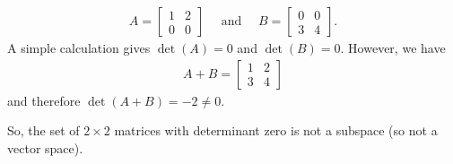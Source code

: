\documentclass[12pt]{article}
\begin{document}
\begin{enumerate}
\begin{itemize}
			\begin{align*}
			A = \begin{bmatrix}
			1 & 2 \\ 0 & 0
			\end{bmatrix}
			\quad \text{ and } \quad
			B = \begin{bmatrix}
			0 & 0 \\ 3 & 4
			\end{bmatrix} .
			\end{align*}
		A simple calculation gives $\det (A) = 0$ and $\det (B) = 0$. However, we have
			\begin{align*}
			A + B = \begin{bmatrix}
			1 & 2 \\ 3 & 4
			\end{bmatrix}
			\end{align*}
		and therefore $\det (A + B) = -2 \neq 0$.
		\end{itemize}
	So, the set of $2 \times 2$ matrices with determinant zero is not a subspace (so not a vector space).
	\end{enumerate}		
	
	
	\newpage
	
\end{document}

